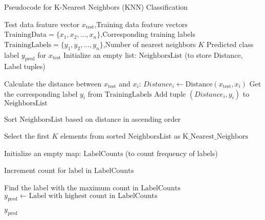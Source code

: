 \begin{algorithm}[H]
  \caption{Pseudocode for K-Nearest Neighbors (KNN) Classification}
  \begin{algorithmic}[1]
    \Require Test data feature vector $x_{\text{test}}$,Training data feature vectors $\text{TrainingData} = \{x_1, x_2, ..., x_n\}$,Corresponding training labels $\text{TrainingLabels} = \{y_1, y_2, ..., y_n\}$,Number of nearest neighbors $K$
    \Ensure Predicted class label $y_{\text{pred}}$ for $x_{\text{test}}$
    \State Initialize an empty list: $\text{NeighborsList}$ (to store Distance, Label tuples)

      \State Calculate the distance between $x_{\text{test}}$ and $x_i$: $Distance_i \leftarrow \text{Distance}(x_{\text{test}}, x_i)$
      \State Get the corresponding label $y_i$ from $\text{TrainingLabels}$
      \State Add tuple $(Distance_i, y_i)$ to $\text{NeighborsList}$
    \EndFor

    \State Sort $\text{NeighborsList}$ based on distance in ascending order

    \State Select the first $K$ elements from sorted $\text{NeighborsList}$ as $\text{K\_Nearest\_Neighbors}$

    \State Initialize an empty map: $\text{LabelCounts}$ (to count frequency of labels)

      \State Increment count for $\text{label}$ in $\text{LabelCounts}$
    \EndFor

    \State Find the label with the maximum count in $\text{LabelCounts}$
    \State $y_{\text{pred}} \leftarrow \text{Label with highest count in } \text{LabelCounts}$

    \State \Return $y_{\text{pred}}$
  \end{algorithmic}
\end{algorithm}
